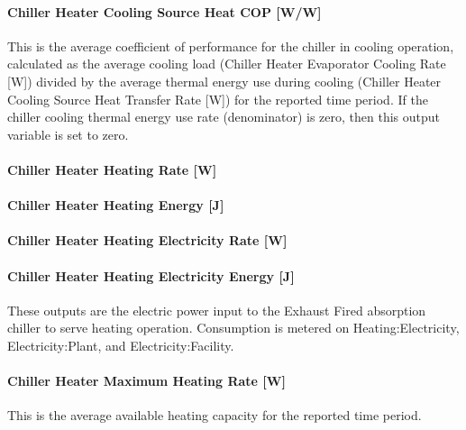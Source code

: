 \paragraph{Chiller Heater Cooling Source Heat COP {[}W/W{]}}\label{chiller-heater-cooling-source-heat-cop-ww}

This is the average coefficient of performance for the chiller in cooling operation, calculated as the average cooling load (Chiller Heater Evaporator Cooling Rate {[}W{]}) divided by the average thermal energy use during cooling (Chiller Heater Cooling Source Heat Transfer Rate {[}W{]}) for the reported time period. If the chiller cooling thermal energy use rate (denominator) is zero, then this output variable is set to zero.

\paragraph{Chiller Heater Heating Rate {[}W{]}}\label{chiller-heater-heating-rate-w-2}

\paragraph{Chiller Heater Heating Energy {[}J{]}}\label{chiller-heater-heating-energy-j-1}

\paragraph{Chiller Heater Heating Electricity Rate {[}W{]}}\label{chiller-heater-heating-electric-power-w-1}

\paragraph{Chiller Heater Heating Electricity Energy {[}J{]}}\label{chiller-heater-heating-electric-energy-j}

These outputs are the electric power input to the Exhaust Fired absorption chiller to serve heating operation. Consumption is metered on Heating:Electricity, Electricity:Plant, and Electricity:Facility.

\paragraph{Chiller Heater Maximum Heating Rate {[}W{]}}\label{chiller-heater-maximum-heating-rate-w}

This is the average available heating capacity for the reported time period.

